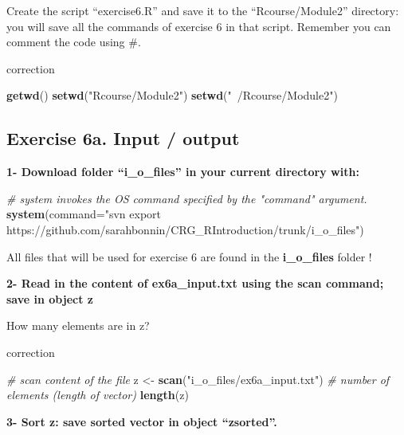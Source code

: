 \documentclass[]{book}
\newenvironment{Shaded}{\begin{snugshade}}{\end{snugshade}}
\newcommand{\CommentTok}[1]{\textcolor[rgb]{0.56,0.35,0.01}{\textit{#1}}}
\newcommand{\DataTypeTok}[1]{\textcolor[rgb]{0.13,0.29,0.53}{#1}}
\newcommand{\KeywordTok}[1]{\textcolor[rgb]{0.13,0.29,0.53}{\textbf{#1}}}
\newcommand{\NormalTok}[1]{#1}
\newcommand{\StringTok}[1]{\textcolor[rgb]{0.31,0.60,0.02}{#1}}
\begin{document}
Create the script ``exercise6.R'' and save it to the ``Rcourse/Module2'' directory: you will save all the commands of exercise 6 in that script.
Remember you can comment the code using \#.

correction

\begin{Shaded}
\begin{Highlighting}[]
\KeywordTok{getwd}\NormalTok{()}
\KeywordTok{setwd}\NormalTok{(}\StringTok{"Rcourse/Module2"}\NormalTok{)}
\KeywordTok{setwd}\NormalTok{(}\StringTok{"~/Rcourse/Module2"}\NormalTok{)}
\end{Highlighting}
\end{Shaded}

\hypertarget{exercise-6a.-input-output}{%
\subsection{Exercise 6a. Input / output}\label{exercise-6a.-input-output}}

\textbf{1- Download folder ``i\_o\_files'' in your current directory with:}

\begin{Shaded}
\begin{Highlighting}[]
\CommentTok{# system invokes the OS command specified by the "command" argument.}
\KeywordTok{system}\NormalTok{(}\DataTypeTok{command=}\StringTok{"svn export https://github.com/sarahbonnin/CRG_RIntroduction/trunk/i_o_files"}\NormalTok{)}
\end{Highlighting}
\end{Shaded}

All files that will be used for exercise 6 are found in the \textbf{i\_o\_files} folder !

\textbf{2- Read in the content of ex6a\_input.txt using the scan command; save in object z}

How many elements are in z?

correction

\begin{Shaded}
\begin{Highlighting}[]
\CommentTok{# scan content of the file}
\NormalTok{z <-}\StringTok{ }\KeywordTok{scan}\NormalTok{(}\StringTok{"i_o_files/ex6a_input.txt"}\NormalTok{)}
\CommentTok{# number of elements (length of vector)}
\KeywordTok{length}\NormalTok{(z)}
\end{Highlighting}
\end{Shaded}

\textbf{3- Sort z: save sorted vector in object ``zsorted''.}
\end{document}
